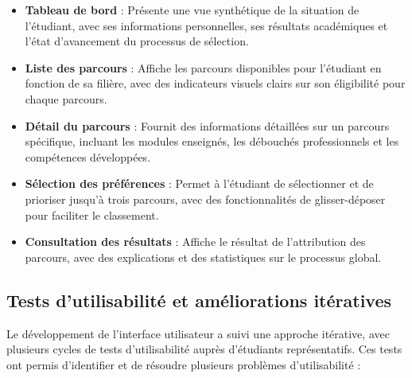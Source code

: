 \documentclass[french,12pt]{report} %
\begin{document}
\begin{itemize}
    \item \textbf{Tableau de bord} : Présente une vue synthétique de la situation de l'étudiant, avec ses informations personnelles, ses résultats académiques et l'état d'avancement du processus de sélection.
    \item \textbf{Liste des parcours} : Affiche les parcours disponibles pour l'étudiant en fonction de sa filière, avec des indicateurs visuels clairs sur son éligibilité pour chaque parcours.
    \item \textbf{Détail du parcours} : Fournit des informations détaillées sur un parcours spécifique, incluant les modules enseignés, les débouchés professionnels et les compétences développées.
    \item \textbf{Sélection des préférences} : Permet à l'étudiant de sélectionner et de prioriser jusqu'à trois parcours, avec des fonctionnalités de glisser-déposer pour faciliter le classement.
    \item \textbf{Consultation des résultats} : Affiche le résultat de l'attribution des parcours, avec des explications et des statistiques sur le processus global.
\end{itemize}

\subsection{Tests d'utilisabilité et améliorations itératives}

Le développement de l'interface utilisateur a suivi une approche itérative, avec plusieurs cycles de tests d'utilisabilité auprès d'étudiants représentatifs. Ces tests ont permis d'identifier et de résoudre plusieurs problèmes d'utilisabilité :
\end{document}
